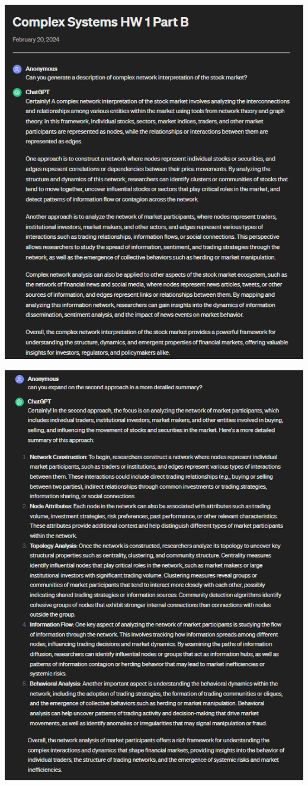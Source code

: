 \documentclass[12pt]{article}
\begin{document}
\includegraphics{prompt1.png}

\includegraphics{prompt2.png}
\end{document}
